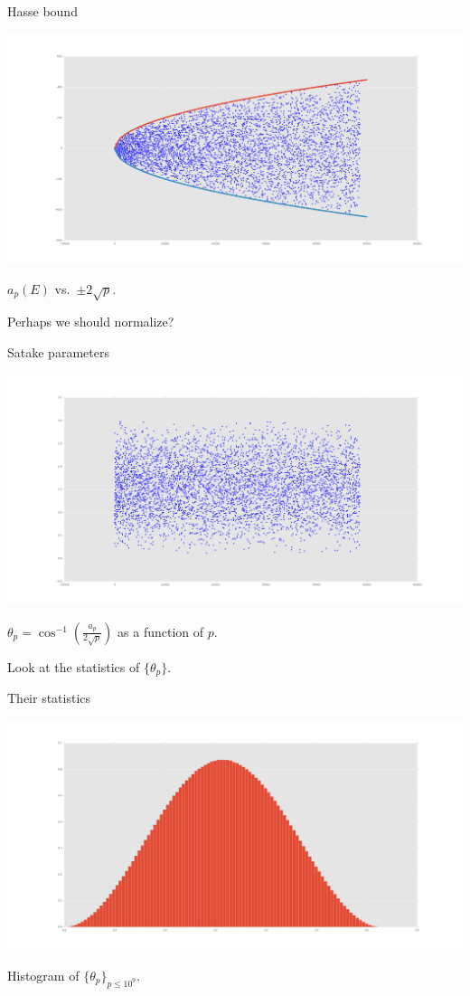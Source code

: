 \documentclass{beamer}
\begin{document}
\begin{frame}{Hasse bound}
\begin{center}
\includegraphics[width=\textwidth]{rank2_Hasse}

$a_p(E)$ vs.~$\pm 2\sqrt p$.
\end{center}

\pause
Perhaps we should normalize?
\end{frame}

\begin{frame}{Satake parameters}
\begin{center}
\includegraphics[width=\textwidth]{rank2_Satake}

$\theta_p = \cos^{-1}\left(\frac{a_p}{2\sqrt p}\right)$ as a function of $p$.
\end{center}

\pause
Look at the statistics of $\{\theta_p\}$. 
\end{frame}

\begin{frame}{Their statistics}
\begin{center}
\includegraphics[width=\textwidth]{hist}

Histogram of $\{\theta_p\}_{p\leqslant 10^9}$.
\end{center}
\end{frame}
\end{document}
